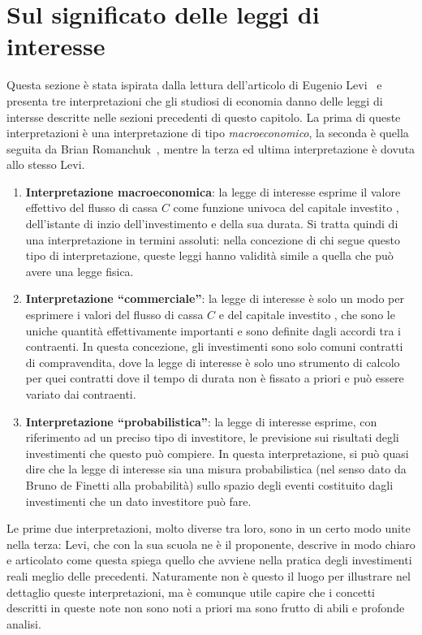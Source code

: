 \section{Sul significato delle leggi di interesse}
\label{sec:significato}

Questa sezione è stata ispirata dalla lettura dell'articolo di Eugenio Levi~\cite{Levi1957} e presenta tre interpretazioni che gli studiosi di economia
danno delle leggi di intersse descritte nelle sezioni precedenti di questo capitolo. La prima di queste interpretazioni è una interpretazione di tipo
\emph{macroeconomico}, la seconda è quella seguita da Brian Romanchuk~\cite{Romanchuk2021}, mentre la terza ed ultima interpretazione è dovuta allo
stesso Levi.
\begin{enumerate}
\item \textbf{Interpretazione macroeconomica}: la legge di interesse esprime il valore effettivo del flusso di cassa $C$ come funzione univoca del capitale investito
  \VA, dell’istante di inzio dell’investimento e della sua durata. Si tratta quindi di una interpretazione in termini assoluti: nella concezione di chi segue questo
  tipo di interpretazione, queste leggi hanno validità simile a quella che può avere una legge fisica.
\item \textbf{Interpretazione ``commerciale''}\footnotemark{}: la legge di interesse è solo un modo per esprimere i valori del flusso di cassa $C$ e  del capitale
  investito \VA,  che sono le uniche quantità effettivamente importanti e sono definite dagli accordi tra i contraenti. In questa concezione, gli investimenti sono
  solo comuni contratti di compravendita,  dove la legge di interesse è solo uno strumento di calcolo per quei contratti dove il tempo di durata non è fissato a
  priori e può essere variato dai contraenti.
\item \textbf{Interpretazione ``probabilistica''}\footnotemark[\value{footnote}]: la legge di interesse esprime, con riferimento ad un preciso tipo di investitore,
  le previsione sui risultati degli investimenti che questo può compiere. In questa interpretazione, si può quasi dire che la legge di interesse sia una misura
  probabilistica (nel senso dato da Bruno de Finetti alla probabilità) sullo spazio degli eventi costituito dagli investimenti che un dato investitore può fare.
\end{enumerate}

Le prime due interpretazioni, molto diverse tra loro, sono in un certo modo unite nella terza: Levi, che con la sua scuola ne è il proponente, descrive in modo
chiaro e articolato come questa spiega quello che avviene nella pratica degli investimenti reali meglio delle precedenti. Naturamente non è questo il luogo per
illustrare nel dettaglio queste interpretazioni, ma è comunque utile capire che i concetti descritti in queste note non sono noti a priori ma sono frutto di abili
e profonde analisi.

